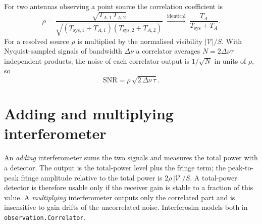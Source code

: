 For two antennas observing a point source the correlation coefficient
is
\begin{equation}
  \rho = \frac{\sqrt{T_{A,1}\,T_{A,2}}}
              {\sqrt{(T_{\mathrm{sys},1}+T_{A,1})(T_{\mathrm{sys},2}+T_{A,2})}}
  \;\xrightarrow{\text{identical}}\;
  \frac{T_A}{T_{\mathrm{sys}}+T_A}.
\end{equation}
For a resolved source $\rho$ is multiplied by the normalised
visibility $|\mathcal V|/S$. With Nyquist-sampled signals of bandwidth
$\Delta\nu$ a correlator averages $N = 2\Delta\nu\tau$ independent
products; the noise of each correlator output is $1/\sqrt{N}$ in units
of $\rho$, so
\begin{equation}
  \mathrm{SNR} = \rho\,\sqrt{2\,\Delta\nu\,\tau} .
  \label{eq:snr-corr}
\end{equation}

\section{Adding and multiplying interferometer}

An \emph{adding} interferometer sums the two signals and measures the
total power with a detector. The output is the total-power level plus
the fringe term; the peak-to-peak fringe amplitude relative to the total
power is $2\rho\,|\mathcal V|/S$. A total-power detector is therefore
usable only if the receiver gain is stable to a fraction of this value.
A \emph{multiplying} interferometer outputs only the correlated part and
is insensitive to gain drifts of the uncorrelated noise. Interferosim
models both in \texttt{observation.Correlator}.
